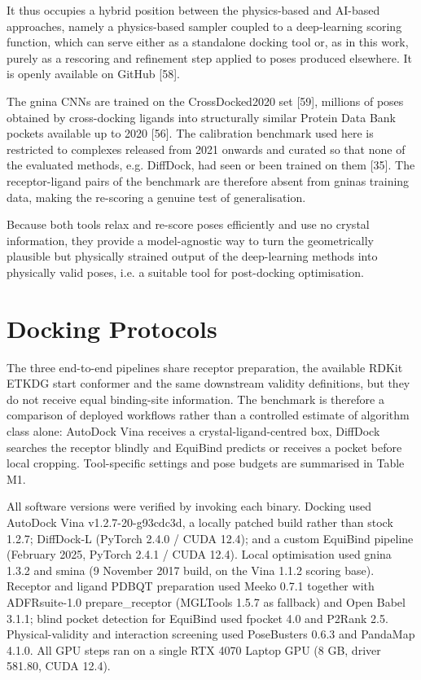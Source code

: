 It thus occupies a hybrid position between the physics-based and AI-based approaches, namely a physics-based sampler coupled to a deep-learning scoring function, which can serve either as a standalone docking tool or, as in this work, purely as a rescoring and refinement step applied to poses produced elsewhere. It is openly available on GitHub {[}58{]}.

The gnina CNNs are trained on the CrossDocked2020 set {[}59{]}, millions of poses obtained by cross-docking ligands into structurally similar Protein Data Bank pockets available up to 2020 {[}56{]}. The calibration benchmark used here is restricted to complexes released from 2021 onwards and curated so that none of the evaluated methods, e.g. DiffDock, had seen or been trained on them {[}35{]}. The receptor-ligand pairs of the benchmark are therefore absent from gnina\textquotesingle s training data, making the re-scoring a genuine test of generalisation.

Because both tools relax and re-score poses efficiently and use no crystal information, they provide a model-agnostic way to turn the geometrically plausible but physically strained output of the deep-learning methods into physically valid poses, i.e. a suitable tool for post-docking optimisation.

\hypertarget{docking-protocols}{%
\section{Docking Protocols}\label{docking-protocols}}

The three end-to-end pipelines share receptor preparation, the available RDKit ETKDG start conformer and the same downstream validity definitions, but they do not receive equal binding-site information. The benchmark is therefore a comparison of deployed workflows rather than a controlled estimate of algorithm class alone: AutoDock Vina receives a crystal-ligand-centred box, DiffDock searches the receptor blindly and EquiBind predicts or receives a pocket before local cropping. Tool-specific settings and pose budgets are summarised in Table M1.

All software versions were verified by invoking each binary. Docking used AutoDock Vina v1.2.7-20-g93cdc3d, a locally patched build rather than stock 1.2.7; DiffDock-L (PyTorch 2.4.0 / CUDA 12.4); and a custom EquiBind pipeline (February 2025, PyTorch 2.4.1 / CUDA 12.4). Local optimisation used gnina 1.3.2 and smina (9 November 2017 build, on the Vina 1.1.2 scoring base). Receptor and ligand PDBQT preparation used Meeko 0.7.1 together with ADFRsuite-1.0 prepare\_receptor (MGLTools 1.5.7 as fallback) and Open Babel 3.1.1; blind pocket detection for EquiBind used fpocket 4.0 and P2Rank 2.5. Physical-validity and interaction screening used PoseBusters 0.6.3 and PandaMap 4.1.0. All GPU steps ran on a single RTX 4070 Laptop GPU (8 GB, driver 581.80, CUDA 12.4).


